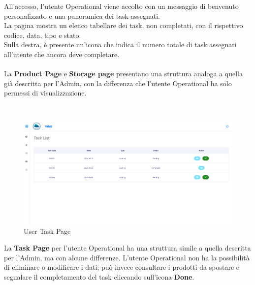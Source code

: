 All'accesso, l'utente Operational viene accolto con un messaggio di benvenuto personalizzato e una panoramica dei task assegnati.\\
La pagina mostra un elenco tabellare dei task, non completati, con il rispettivo codice, data, tipo e stato.\\
Sulla destra, è presente un'icona che indica il numero totale di task assegnati all'utente che ancora deve completare.
\\\\
La \textbf{Product Page} e \textbf{Storage page} presentano una struttura analoga a quella già descritta per l'Admin,
con la differenza che l'utente Operational ha solo permessi di visualizzazione.

\\
\begin{figure}[H]
    \centering
    \includegraphics[width=\textwidth]{document/sections/img/Storyboard/userTaskPage.png}
    \caption{User Task Page}
    \label{fig:userTaskPage}
\end{figure}
La \textbf{Task Page} per l'utente Operational ha una struttura simile a quella descritta per l'Admin, ma con alcune
differenze. L'utente Operational non ha la possibilità di eliminare o modificare i dati; può invece consultare i
prodotti da spostare e segnalare il completamento del task cliccando sull'icona \textbf{Done}.